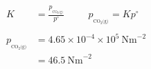 \documentclass[11pt,a4paper]{article}
\begin{document}
\begin{align*}
		K &= \frac{p_{_{{\text{CO}}_{2} \text{(g)}}}}{p^\circ} \qquad \ \ p_{_{{\text{CO}}_{2} \text{(g)}}} = Kp^\circ \\                                                                                                                                                                                                                                                                                                                                                                                                                                                                                                                                                                                                                                                                                                                                                                                                                                                                                                                                                                                                                                                                                                                 
		\\
                     p_{_{{\text{CO}}_{2} \text{(g)}}} &= 4.65 \times 10^{-4} \times 10^5 \ \text{Nm}^{-2} \\
		&= 46.5 \ \text{Nm}^{-2}
	\end{align*}

\newpage 
\end{document}
